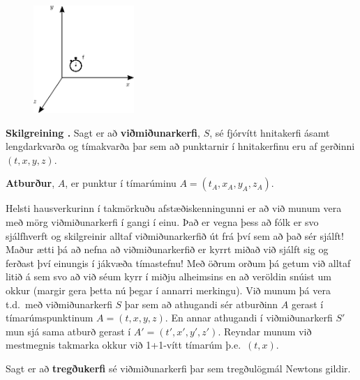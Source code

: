 \ifdefined \wholebook \else\documentclass[oneside]{book}\usepackage{EdlBook}\graphicspath{{figures/}}
\begin{document}
\begin{tcolorbox}
\begin{minipage}{\linewidth}

\begin{figure}
\vspace{-0.5cm}
\hspace{0.5cm}
\includegraphics[width = 1.5in]{figures/spacetime.pdf}
\end{figure}
\textbf{Skilgreining \thetheorem.} Sagt er að \textbf{viðmiðunarkerfi}, $S$, sé fjórvítt hnitakerfi ásamt lengdarkvarða og tímakvarða þar sem að punktarnir í hnitakerfinu eru af gerðinni $(t,x,y,z)$.

\vspace{1.2cm}
\textbf{Atburður}, $A$, er punktur í tímarúminu $A = (t_A,x_A,y_A,z_A)$.
\vspace{1cm}
\end{minipage}
\end{tcolorbox}

Helsti hausverkurinn í takmörkuðu afstæðiskenningunni er að við munum vera með mörg viðmiðunarkerfi í gangi í einu. Það er vegna þess að fólk er svo sjálfhverft og skilgreinir alltaf viðmiðunarkerfið út frá því sem að það sér sjálft! Maður ætti þá að nefna að viðmiðunarkerfið er kyrrt miðað við sjálft sig og ferðast því einungis í jákvæða tímastefnu! Með öðrum orðum þá getum við alltaf litið á sem svo að við séum kyrr í miðju alheimsins en að veröldin snúist um okkur (margir gera þetta nú þegar í annarri merkingu). Við munum þá vera t.d.~með viðmiðunarkerfi $S$ þar sem að athugandi sér atburðinn $A$ gerast í tímarúmspunktinum $A = (t,x,y,z)$. En annar athugandi í viðmiðunarkerfi $S'$ mun sjá sama atburð gerast í $A' = (t',x',y',z')$. Reyndar munum við mestmegnis takmarka okkur við 1+1-vítt tímarúm þ.e.~$(t,x)$. \\

\begin{tcolorbox}
\begin{definition}
Sagt er að \textbf{tregðukerfi} sé viðmiðunarkerfi þar sem tregðulögmál Newtons gildir.
\end{definition}
\end{tcolorbox}
\end{document}
